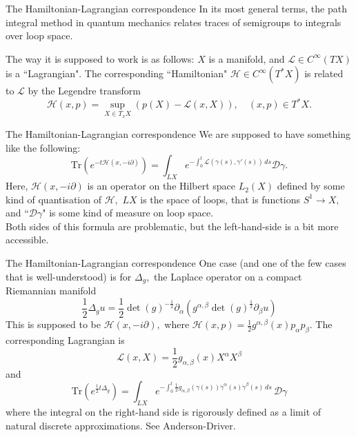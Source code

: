 \documentclass{beamer}
\numberwithin{equation}{section}
\theoremstyle{plain}
\theoremstyle{plain}
\theoremstyle{definition}
\theoremstyle{plain}
\theoremstyle{plain}
\theoremstyle{definition}
\newcommand{\Dc}{\mathcal{D}}
\newcommand{\Hc}{\mathcal{H}}
\newcommand{\Lc}{\mathcal{L}}
\newcommand{\Tr}{\mathrm{Tr}}
\begin{document}
\begin{frame}{The Hamiltonian-Lagrangian correspondence}
  In its most general terms, the path integral method in quantum mechanics relates traces of semigroups
  to integrals over loop space. 
  
  The way it is supposed to work is as follows: $X$ is a manifold, and $\Lc \in C^\infty(TX)$ is a ``Lagrangian". The corresponding
  ``Hamiltonian" $\Hc\in C^\infty(T^*X)$ is related to $\Lc$ by the Legendre transform 
  \[
    \Hc(x,p) = \sup_{X \in T_xX} (p(X)-\Lc(x,X)),\quad (x,p) \in T^*X.
  \]
\end{frame}

\begin{frame}{The Hamiltonian-Lagrangian correspondence}
  We are supposed to have something like the following:
  \begin{equation}
    \Tr(e^{-t\Hc(x,-i\partial)}) = \int_{LX} e^{-\int_0^t \Lc(\gamma(s),\gamma'(s))\,ds} \Dc \gamma.
  \end{equation}
  Here, $\Hc(x,-i\partial)$ is an operator on the Hilbert space $L_2(X)$ defined by some kind of quantisation of $\Hc,$ $LX$ is the space of loops, that is functions $S^1\to X,$ and ``$\Dc\gamma$" is some kind of measure on loop space.\\
  
  
  Both sides of this formula are problematic, but the left-hand-side is a bit more accessible. 
\end{frame}

\begin{frame}{The Hamiltonian-Lagrangian correspondence}
  One case (and one of the few cases that is well-understood) is for $\Delta_g,$ the Laplace operator on a compact Riemannian manifold
  \[
    \frac12\Delta_gu = \frac12\det(g)^{-\frac12}\partial_{\alpha}(g^{\alpha,\beta}\det(g)^{\frac12}\partial_{\beta}u)
  \]
  This is supposed to be $\Hc(x,-i\partial),$ where $\Hc(x,p) = \frac12 g^{\alpha,\beta}(x)p_{\alpha}p_{\beta}.$ The corresponding Lagrangian is 
  \[
    \Lc(x,X) = \frac12 g_{\alpha,\beta}(x)X^{\alpha}X^{\beta}
  \]
  and 
  \[
    \Tr(e^{\frac12 t\Delta_g}) = \int_{LX} e^{-\int_0^t \frac12 g_{\alpha,\beta}(\gamma(s))\dot{\gamma}^{\alpha}(s)\dot{\gamma}^\beta(s)\,ds}\, \Dc \gamma
  \]
  where the integral on the right-hand side is rigorously defined as a limit of natural discrete approximations. See Anderson-Driver.
\end{frame}
\end{document}
